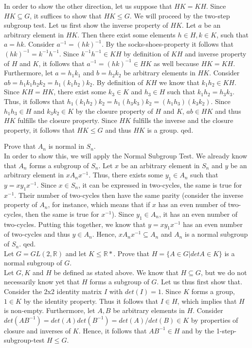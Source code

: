 \documentclass{article}
\newcommand{\R}{\mathbb{R}}
\begin{document}
In order to show the other direction, let us suppose that $HK=KH$. Since $HK \subseteq G$, it suffices to show that $HK \leq G$. We will proceed by the two-step subgroup test. Let us first show the inverse property of $HK$. Let $a$ be an arbitrary element in $HK$. Then there exist some elements $h \in H, k \in K$, such that $a=hk$. Consider $a^{-1}=(hk)^{-1}$. By the socks-shoes-property it follows that $(hk)^{-1}=k^{-1}h^{-1}$. Since $k^{-1}h^{-1} \in KH$ by definition of $KH$ and inverse property of $H$ and $K$, it follows that $a^{-1}=(hk)^{-1} \in HK$ as well because $HK=KH$. Furthermore, let $a=h_1k_1$ and $b=h_2k_2$ be arbitrary elements in $HK$. Consider $ab=h_1k_1h_2k_2=h_1(k_1h_2)k_2$. By definition of $KH$ we know that $k_1h_2 \in KH$. Since $KH=HK$, there exist some $k_3 \in K$ and $h_3 \in H$ such that $k_1h_2=h_3k_3$. Thus, it follows that $h_1(k_1h_2)k_2=h_1(h_3k_3)k_2=(h_1h_3)(k_3k_2)$. Since $h_1h_3 \in H$ and $k_3k_2 \in K$ by the closure property of $H$ and $K$, $ab \in HK$ and thus $HK$ fulfills the closure property. Since $HK$ fulfills the inverse and the closure property, it follows that $HK \leq G$ and thus $HK$ is a group. qed. \\

\newpage

 Prove that $A_n$ is normal in $S_n$.\\

 In order to show this, we will apply the Normal Subgroup Test. We already know that $A_n$ forms a subgroup of $S_n$. Let $x$ be an arbitrary element in $S_n$ and $y$ be an arbitrary element in $xA_nx^{-1}$. Thus, there exists some $y_1 \in A_n$ such that $y=xy_1x^{-1}$. Since $x \in S_n$, it can be expressed in two-cycles, the same is true for $x^{-1}$. Their number of two-cycles then have the same parity (consider the inverse property of $A_n$, for instance, which means that if $x$ has an even number of two-cycles, then the same is true for $x^{-1}$). Since $y_1 \in A_n$, it has an even number of two-cycles. Putting this together, we know that $y=xy_1x^{-1}$ has an even number of two-cycles and thus $y \in A_n$. Hence, $xA_nx^{-1} \subseteq A_n$ and $A_n$ is a normal subgroup of $S_n$. qed.\\

 Let $G=GL(2, \R)$ and let $K \leq \R*$. Prove that $H=\{A \in G | det A \in K\}$ is a normal subgroup of $G$.\\

 Let $G, K$ and $H$ be defined as stated above. We know that $H \subseteq G$, but we do not necessarily know yet that $H$ forms a subgroup of $G$. Let us thus first show that. Consider the 2x2 identity matrix $I$ with $det(I)=1$. Since $K$ forms a group, $1 \in K$ by the identity property. Thus it follows that $I \in H$, which implies that $H$ is non-empty. Furthermore, let $A,B$ be arbitrary elements in $H$. Consider $det(AB^{-1})=det(A)det(B^{-1})=det(A)/det(B) \in K$ by properties of closure and inverses of $K$. Hence, it follows that $AB^{-1} \in H$ and by the 1-step-subgroup-test $H \leq G$. \\
\end{document}
